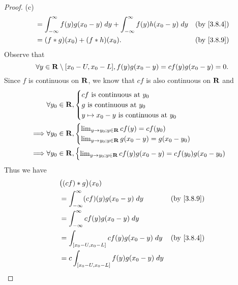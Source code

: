\begin{proof}{(c)}
\begin{align*}
     & = \int_{-\infty}^\infty f(y) g(x_0 - y) \; dy + \int_{-\infty}^\infty f(y) h(x_0 - y) \; dy              & \text{(by \cref{3.8.4})} \\
     & = (f * g)(x_0) + (f * h)(x_0).                                                                           & \text{(by \cref{3.8.9})}
  \end{align*}
  Observe that
  \[
    \forall y \in \mathbf{R} \setminus [x_0 - U, x_0 - L], f(y) g(x_0 - y) = c f(y) g(x_0 - y) = 0.
  \]
  Since \(f\) is continuous on \(\mathbf{R}\), we know that \(cf\) is also continuous on \(\mathbf{R}\) and
  \begin{align*}
             & \forall y_0 \in \mathbf{R}, \begin{cases}
                                     cf \text{ is continuous at } y_0 \\
                                     g \text{ is continuous at } y_0  \\
                                     y \mapsto x_0 - y \text{ is continuous at } y_0
                                   \end{cases}                     \\
    \implies & \forall y_0 \in \mathbf{R}, \begin{cases}
                                     \lim_{y \to y_0 ; y \in \mathbf{R}} cf(y) = cf(y_0) \\
                                     \lim_{y \to y_0 ; y \in \mathbf{R}} g(x_0 - y) = g(x_0 - y_0)
                                   \end{cases}               \\
    \implies & \forall y_0 \in \mathbf{R}, \begin{cases}
                                     \lim_{y \to y_0 ; y \in \mathbf{R}} cf(y) g(x_0 - y) = cf(y_0) g(x_0 - y_0)
                                   \end{cases}
  \end{align*}
  Thus we have
  \begin{align*}
     & \big((cf) * g\big)(x_0)                                                        \\
     & = \int_{-\infty}^\infty (cf)(y) g(x_0 - y) \; dy    & \text{(by \cref{3.8.9})} \\
     & = \int_{-\infty}^\infty c f(y) g(x_0 - y) \; dy                                \\
     & = \int_{[x_0 - U, x_0 - L]} c f(y) g(x_0 - y) \; dy & \text{(by \cref{3.8.4})} \\
     & = c \int_{[x_0 - U, x_0 - L]} f(y) g(x_0 - y) \; dy                            \\

\end{align*}
\end{proof}
